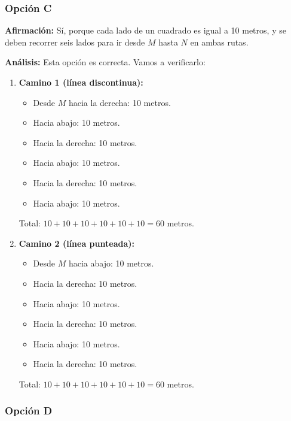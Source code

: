 \documentclass[
]{article}
\providecommand{\tightlist}{%
  \setlength{\itemsep}{0pt}\setlength{\parskip}{0pt}}
\begin{document}
\subsubsection{Opción C}\label{opciuxf3n-c-1}

\textbf{Afirmación:} Sí, porque cada lado de un cuadrado es igual a 10
metros, y se deben recorrer seis lados para ir desde \(M\) hasta \(N\)
en ambas rutas.

\textbf{Análisis:} Esta opción es correcta. Vamos a verificarlo:

\begin{enumerate}
\def\labelenumi{\arabic{enumi}.}
\item
  \textbf{Camino 1 (línea discontinua):}

  \begin{itemize}
  \tightlist
  \item
    Desde \(M\) hacia la derecha: 10 metros.
  \item
    Hacia abajo: 10 metros.
  \item
    Hacia la derecha: 10 metros.
  \item
    Hacia abajo: 10 metros.
  \item
    Hacia la derecha: 10 metros.
  \item
    Hacia abajo: 10 metros.
  \end{itemize}

  Total: \(10 + 10 + 10 + 10 + 10 + 10 = 60\) metros.
\item
  \textbf{Camino 2 (línea punteada):}

  \begin{itemize}
  \tightlist
  \item
    Desde \(M\) hacia abajo: 10 metros.
  \item
    Hacia la derecha: 10 metros.
  \item
    Hacia abajo: 10 metros.
  \item
    Hacia la derecha: 10 metros.
  \item
    Hacia abajo: 10 metros.
  \item
    Hacia la derecha: 10 metros.
  \end{itemize}

  Total: \(10 + 10 + 10 + 10 + 10 + 10 = 60\) metros.
\end{enumerate}

\subsubsection{Opción D}\label{opciuxf3n-d-1}
\end{document}
